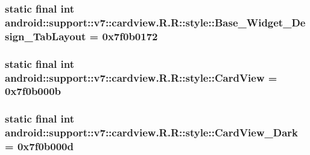 \hypertarget{classandroid_1_1support_1_1v7_1_1cardview_1_1_r_1_1style_98f5332331dd74e916ccf30267311061}{
\subsubsection[{Base\_\-Widget\_\-Design\_\-TabLayout}]{\setlength{\rightskip}{0pt plus 5cm}static final int android::support::v7::cardview.R.R::style::Base\_\-Widget\_\-Design\_\-TabLayout = 0x7f0b0172}}
\label{classandroid_1_1support_1_1v7_1_1cardview_1_1_r_1_1style_98f5332331dd74e916ccf30267311061}


\hypertarget{classandroid_1_1support_1_1v7_1_1cardview_1_1_r_1_1style_792e7e0f95e8b7327b713bd96e75640c}{
\subsubsection[{CardView}]{\setlength{\rightskip}{0pt plus 5cm}static final int android::support::v7::cardview.R.R::style::CardView = 0x7f0b000b}}
\label{classandroid_1_1support_1_1v7_1_1cardview_1_1_r_1_1style_792e7e0f95e8b7327b713bd96e75640c}


\hypertarget{classandroid_1_1support_1_1v7_1_1cardview_1_1_r_1_1style_c6d6250429f101cc5250ab74aaa333c1}{
\subsubsection[{CardView\_\-Dark}]{\setlength{\rightskip}{0pt plus 5cm}static final int android::support::v7::cardview.R.R::style::CardView\_\-Dark = 0x7f0b000d}}
\label{classandroid_1_1support_1_1v7_1_1cardview_1_1_r_1_1style_c6d6250429f101cc5250ab74aaa333c1}


